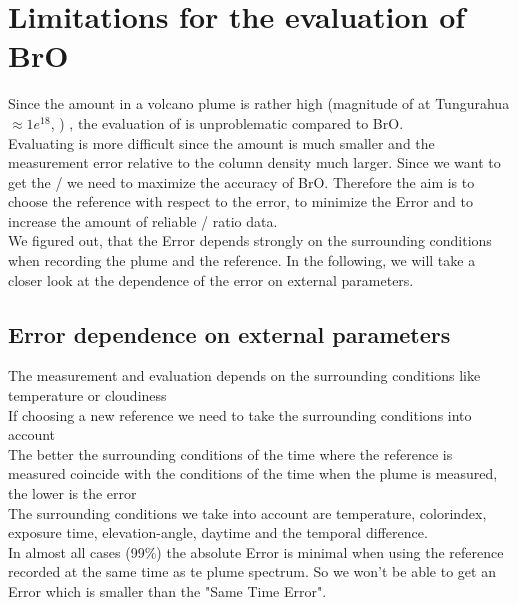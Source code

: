 \documentclass  [
  paper    = a4,
  BCOR     = 10mm,
  twoside,
  fontsize = 12pt,
  fleqn,
  toc      = bibnumbered,
  toc      = listofnumbered,
  numbers  = noendperiod,
  headings = normal,
  listof   = leveldown,
  version  = 3.03
]                                       {scrreprt}
\begin{document}
	\begin{figure}
		\centering
		\caption{}
		\label{fig:contaminationdependencyso2}
	\end{figure}
	\begin{figure}
		\centering
		\caption{}
		\label{fig:contaminationdependencybro}
	\end{figure}
	\begin{figure}
		\centering
		\caption{}
		\label{fig:contaminationdependencyratio}
	\end{figure}
	\chapter{Limitations for the evaluation of  BrO}
    Since the  amount in a volcano plume is rather high (magnitude of  at Tungurahua $\approx 1e^{18}$, \cite{WarnachSimon}) , the evaluation of  is unproblematic compared to BrO.\\
	Evaluating  is more difficult since the amount is much smaller and the measurement error relative to the column density much larger. Since we want to get the / we need to maximize the accuracy of BrO.
	Therefore the aim is to choose the reference with respect to the  error, to minimize the  Error and to increase the amount of reliable / ratio data.\\
	We figured out, that the  Error depends strongly on the surrounding conditions when recording the plume and the reference. In the following, we will take a closer look at the dependence of the  error on external parameters. 
	\section{ Error dependence on external parameters}
	The measurement and evaluation depends on the surrounding conditions like temperature or cloudiness \cite{lubcke2014optical}\\
	If choosing a new reference we need to take the surrounding conditions into account\\
	The better the surrounding conditions of the time where the reference is measured coincide with the conditions of the time when the plume is measured, the lower is the  error \\
	The surrounding conditions we take into account are temperature, colorindex, exposure time, elevation-angle, daytime and the temporal difference.\\
	In almost all cases (99\%) the absolute  Error is minimal when using the reference recorded at the same time as te plume spectrum. So we won't be able to get an  Error which is smaller than the "Same Time Error".   
\end{document}
